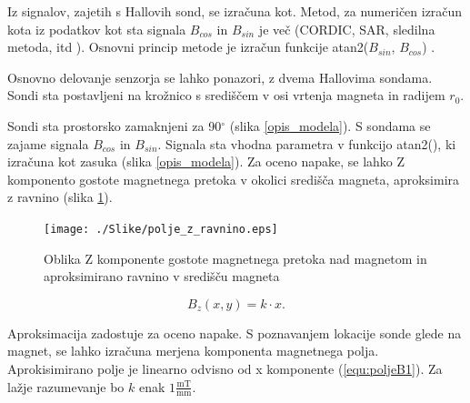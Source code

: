 Iz signalov, zajetih s Hallovih sond, se izračuna kot. Metod, za numeričen izračun kota iz podatkov kot sta signala $B_{cos}$ in $B_{sin}$ je več (CORDIC, SAR, sledilna metoda, itd \cite{ICHaus_interpolate}). Osnovni princip metode je izračun funkcije atan2($B_{sin}$, $B_{cos}$) \cite{atan2Matlab}.

Osnovno delovanje senzorja se lahko ponazori, z dvema Hallovima sondama.  Sondi sta postavljeni na krožnico s središčem v osi vrtenja magneta in radijem $r_0$.

Sondi sta prostorsko zamaknjeni za 90$^\circ$ (slika \ref{opis_modela}).  S sondama se zajame signala $B_{cos}$ in $B_{sin}$. Signala sta vhodna parametra v funkcijo atan2(), ki izračuna kot zasuka (slika \ref{opis_modela}). Za oceno napake, se lahko Z komponento gostote magnetnega pretoka v okolici središča magneta, aproksimira z ravnino (slika \ref{polje_z_ravnino}).
\begin{figure}[h]
	\centering
	\texttt{[image: ./Slike/polje\_z\_ravnino.eps]}
	\caption{Oblika Z komponente gostote magnetnega pretoka nad magnetom in aproksimirano ravnino v središču magneta}
	\label{polje_z_ravnino}
\end{figure}
\begin{equation}
\label{equ:poljeB1}
B_z(x,y)=k\cdot x.
\end{equation} 



Aproksimacija zadostuje za oceno napake. S poznavanjem lokacije sonde glede na magnet, se lahko izračuna merjena komponenta magnetnega polja. Aprokisimirano polje je linearno odvisno od x komponente (\ref{equ:poljeB1}). Za lažje razumevanje bo $k$ enak $1\frac{\mathrm{mT}}{\mathrm{mm}}$.

